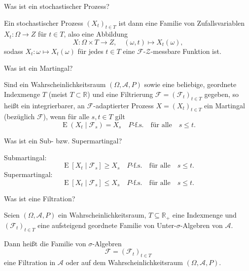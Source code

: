 \begin{QandA}
    \item Was ist ein stochastischer Prozess?
    \begin{answered}
        Ein stochastischer Prozess $(X_{t})_{t\in T}$ ist dann eine Familie von Zufallsvariablen $X_t: \Omega \to Z$ für $t \in T$, also eine Abbildung
        \[
            X: \Omega \times T \to Z, \quad (\omega, t) \mapsto X_t(\omega),
        \]
        sodass $X_t: \omega \mapsto X_t(\omega)$ für jedes $t \in T$ eine $\mathcal{F}$-$\mathcal{Z}$-messbare Funktion ist.
    \end{answered}

    \item Was ist ein Martingal?
    \begin{answered}
        Sind ein Wahrscheinlichkeitsraum $(\Omega ,{\mathcal{A}},P)$ sowie eine beliebige, geordnete Indexmenge $T$ (meist $T\subset \mathbb{R}$) und eine Filtrierung $\mathcal{F} =({\mathcal{F}}_{t})_{t\in T}$ gegeben, so heißt ein integrierbarer, an $\mathcal{F}$-adaptierter Prozess $X=(X_{t})_{t\in T}$ ein Martingal (bezüglich $\mathcal{F}$), wenn für alle $s,t\in T$ gilt
        \[
            \operatorname{E} (X_{t}\mid \mathcal{F}_{s})=X_{s} \quad P\text{-f.s.} \quad \text{für alle} \quad s\leq t.
        \]
    \end{answered}

    \item Was ist ein Sub- bzw. Supermartingal?
    \begin{answered}
        Submartingal:
        \[
            \operatorname{E} [X_{t} \mid{\mathcal{F}}_{s}] \geq X_{s} \quad P\text{-f.s.} \quad \text{für alle} \quad s\leq t.
        \]
        Supermartingal:
        \[
            \operatorname{E} [X_{t} \mid{\mathcal{F}}_{s}] \leq X_{s} \quad P\text{-f.s.} \quad \text{für alle} \quad s\leq t.
        \]
    \end{answered}

    \item Was ist eine Filtration?
    \begin{answered}
        Seien $(\Omega ,{\mathcal{A}},P)$ ein Wahrscheinlichkeitsraum, $T \subseteq \mathbb{R}_+$ eine Indexmenge und $({\mathcal{F}}_{t})_{t\in T}$ eine aufsteigend geordnete Familie von Unter-$\sigma$-Algebren von $\mathcal{A}$.

        Dann heißt die Familie von $\sigma$-Algebren
        \[
            \mathcal{F} = ({\mathcal{F}}_{t})_{t\in T}
        \]
        eine Filtration in $\mathcal{A}$ oder auf dem Wahrscheinlichkeitsraum $(\Omega ,{\mathcal{A}},P)$.
    \end{answered}


\end{QandA}
